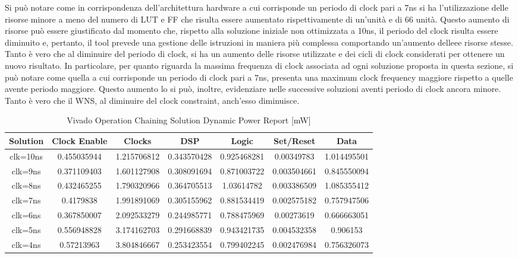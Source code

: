 Si può notare come in corrispondenza dell'architettura hardware a cui corrisponde un periodo di clock pari a 7ns si ha l'utilizzazione delle risorse minore a meno del numero di LUT e FF che risulta essere aumentato rispettivamente di un'unità e di 66 unità. Questo aumento di risorse può essere giustificato dal momento che, rispetto alla soluzione iniziale non ottimizzata a 10ns, il periodo del clock risulta essere diminuito e, pertanto, il tool prevede una gestione delle istruzioni in maniera più complessa comportando un'aumento delleee risorse stesse. Tanto è vero che al diminuire del periodo di clock, si ha un aumento delle risorse utilizzate e dei cicli di clock considerati per ottenere un nuovo risultato. In particolare, per quanto riguarda la massima frequenza di clock associata ad ogni soluzione proposta in questa sezione, si può notare come quella a cui corrisponde un periodo di clock pari a 7ns, presenta una maximum clock frequency maggiore rispetto a quelle avente periodo maggiore. Questo aumento lo si può, inoltre, evidenziare nelle successive soluzioni aventi periodo di clock ancora minore. Tanto è vero che il WNS, al diminuire del clock constraint, anch'esso diminuisce.

\begin{table}[H]
    \centering
    \begin{tabular}{|c|c|c|c|c|c|c|}
        \hline
        \textbf{Solution} & \textbf{Clock Enable} & \textbf{Clocks} & \textbf{DSP} & \textbf{Logic} & \textbf{Set/Reset} & \textbf{Data} \\
        \hline
        clk=10ns & 0.455035944 & 1.215706812 & 0.343570428 & 0.925468281 & 0.00349783 & 1.014495501 \\
        \hline
        clk=9ns & 0.371109403 & 1.601127908 & 0.308091694 & 0.871003722 & 0.003504661 & 0.845550094 \\
        \hline
        clk=8ns & 0.432465255 & 1.790320966 & 0.364705513 & 1.03614782 & 0.003386509 & 1.085355412 \\
        \hline
        clk=7ns & 0.4179838 & 1.991891069 & 0.305155962 & 0.881534419 & 0.002575182 & 0.757947506 \\
        \hline
        clk=6ns & 0.367850007 & 2.092533279 & 0.244985771 & 0.788475969 & 0.00273619 & 0.666663051 \\
        \hline
        clk=5ns & 0.556948828 & 3.174162703 & 0.291668839 & 0.943421735 & 0.004532358 & 0.906153 \\
        \hline
        clk=4ns & 0.57213963 & 3.804846667 & 0.253423554 & 0.799402245 & 0.002476984 & 0.756326073 \\
        \hline
    \end{tabular}
    \caption{Vivado Operation Chaining Solution Dynamic Power Report [mW]}
    \label{tab:vivado-operation-chaining-solution-dynamic-power-reproot}
\end{table}

